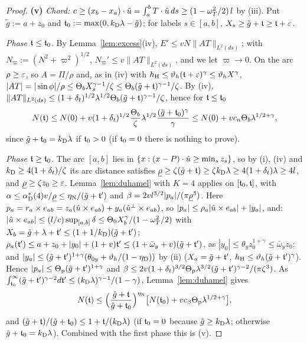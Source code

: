 \begin{proof}
\textbf{(v)} \emph{Chord:} $c\ge(x_b-x_a)\cdot\hat u=\int_a^bT\cdot\hat u\,ds\ge(1-\omega_T^2/2)\,l$ by (iii). Put $\tilde g:=a+z_0$
and $\mathfrak t_0:=\max(0,k_{\mathrm D}\lambda-\tilde g)$; for labels $s\in[a,b]$, $X_s\ge\tilde g+\mathfrak t\ge\mathfrak t+\varepsilon$.

\emph{Phase $\mathfrak t\le\mathfrak t_0$.} By Lemma~\ref{lem:excess}(iv), $E'\le vN\|AT\|_{L^2(ds)}$; with $N_\varpi:=(N^2+\varpi^2)^{1/2}$,
$N_\varpi'\le v\|AT\|_{L^2(ds)}$, and we let $\varpi\to0$. On the arc $\rho\ge\varepsilon$, so $A=\Pi/\rho$ and, as in (iv) with
$h_{\mathrm H}\le\vartheta_h(\mathfrak t+\varepsilon)^\gamma\le\vartheta_hX^\gamma$,
$|AT|=|\sin\phi|/\rho\le\Theta_bX_s^{\gamma-1}/\zeta\le\Theta_b(\tilde g+\mathfrak t)^{\gamma-1}/\zeta$. By (iv),
$\|AT\|_{L^2(ds)}\le(1+\delta_t)^{1/2}\lambda^{1/2}\Theta_b(\tilde g+\mathfrak t)^{\gamma-1}/\zeta$, hence for $\mathfrak t\le\mathfrak t_0$
\[
N(\mathfrak t)\le N(0)+v(1+\delta_t)^{1/2}\frac{\Theta_b}\zeta\lambda^{1/2}\frac{(\tilde g+\mathfrak t_0)^\gamma}\gamma\le N(0)+vc_n\Theta_b\lambda^{1/2+\gamma},
\]
since $\tilde g+\mathfrak t_0=k_{\mathrm D}\lambda$ if $\mathfrak t_0>0$ (if $\mathfrak t_0=0$ there is nothing to prove).

\emph{Phase $\mathfrak t\ge\mathfrak t_0$.} The arc $[a,b]$ lies in $\{x:(x-P)\cdot\hat u\ge\min_sz_s\}$, so by (i), (iv) and
$k_{\mathrm D}\ge4(1+\delta_t)/\zeta$ its arc distance satisfies
$\underline\rho\ge\zeta(\tilde g+\mathfrak t)\ge\zeta k_{\mathrm D}\lambda\ge4(1+\delta_t)\lambda\ge4l$, and $\underline\rho\ge\zeta z_0\ge\varepsilon$. Lemma~\ref{lem:duhamel}
with $K=4$ applies on $[\mathfrak t_0,\mathfrak t]$, with $\alpha\le\alpha^*_{\mathrm D}(4)v/\underline\rho\le\eta_{\mathrm N}/(\tilde g+\mathfrak t')$ and
$\beta=2vl^{3/2}|p_a|/(\pi\underline\rho^3)$.
Here $p_a=r_a\times e_{ab}=z_a(\hat u\times e_{ab})+y_a(\hat u^\perp\times e_{ab})$, so $|p_a|\le\rho_a|\hat u\times e_{ab}|+|y_a|$, and:
$|\hat u\times e_{ab}|\le(l/c)\sup_{[a,b]}\delta\le\Theta_0X_b^\gamma/(1-\omega_T^2/2)$ with
$X_b=\tilde g+\lambda+\mathfrak t'\le(1+1/k_{\mathrm D})(\tilde g+\mathfrak t')$; $\rho_a(\mathfrak t')\le a+z_0+|y_0|+(1+v)\mathfrak t'\le(1+\bar\omega_y+v)(\tilde g+\mathfrak t')$,
as $|y_0|\le\theta_yz_0^{1+\gamma}\le\bar\omega_yz_0$; and $|y_a|\le(\tilde g+\mathfrak t')^{1+\gamma}(\theta_{0y}+\vartheta_h/(1-\eta_{\mathrm D}))$ by (ii)
($X_a=\tilde g+\mathfrak t'$, $h_{\mathrm H}\le\vartheta_h(\tilde g+\mathfrak t')^\gamma$). Hence $|p_a|\le\Theta_{\mathrm p}(\tilde g+\mathfrak t')^{1+\gamma}$ and
$\beta\le2v(1+\delta_t)^{3/2}\Theta_{\mathrm p}\lambda^{3/2}(\tilde g+\mathfrak t')^{\gamma-2}/(\pi\zeta^3)$. As
$\int_{\mathfrak t_0}^\infty(\tilde g+\mathfrak t')^{\gamma-2}d\mathfrak t'\le(k_{\mathrm D}\lambda)^{\gamma-1}/(1-\gamma)$, Lemma~\ref{lem:duhamel} gives
\[
N(\mathfrak t)\le\Bigl(\frac{\tilde g+\mathfrak t}{\tilde g+\mathfrak t_0}\Bigr)^{\eta_{\mathrm N}}\bigl[N(\mathfrak t_0)+vc_\beta\Theta_{\mathrm p}\lambda^{1/2+\gamma}\bigr],
\]
and $(\tilde g+\mathfrak t)/(\tilde g+\mathfrak t_0)\le1+\mathfrak t/(k_{\mathrm D}\lambda)$ (if $\mathfrak t_0=0$ because $\tilde g\ge k_{\mathrm D}\lambda$; otherwise
$\tilde g+\mathfrak t_0=k_{\mathrm D}\lambda$). Combined with the first phase this is (v).
\end{proof}
